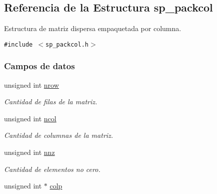 \hypertarget{structsp__packcol}{
\subsection{Referencia de la Estructura sp\_\-packcol}
\label{structsp__packcol}
}
Estructura de matriz dispersa empaquetada por columna.  


{\tt \#include $<$sp\_\-packcol.h$>$}

\subsubsection*{Campos de datos}
\begin{CompactItemize}
\item 
\hypertarget{structsp__packcol_2e12b2881843b0ff8191f0654570a748}{
unsigned int \hyperlink{structsp__packcol_2e12b2881843b0ff8191f0654570a748}{nrow}}
\label{structsp__packcol_2e12b2881843b0ff8191f0654570a748}

\begin{CompactList}\small\item\em Cantidad de filas de la matriz. \item\end{CompactList}\item 
\hypertarget{structsp__packcol_2cc24559101ca3783f1949c8eebacd7c}{
unsigned int \hyperlink{structsp__packcol_2cc24559101ca3783f1949c8eebacd7c}{ncol}}
\label{structsp__packcol_2cc24559101ca3783f1949c8eebacd7c}

\begin{CompactList}\small\item\em Cantidad de columnas de la matriz. \item\end{CompactList}\item 
\hypertarget{structsp__packcol_667202fa30dd3d49982e3b0c8148bde4}{
unsigned int \hyperlink{structsp__packcol_667202fa30dd3d49982e3b0c8148bde4}{nnz}}
\label{structsp__packcol_667202fa30dd3d49982e3b0c8148bde4}

\begin{CompactList}\small\item\em Cantidad de elementos no cero. \item\end{CompactList}\item 
\hypertarget{structsp__packcol_c9a9e31c6b9c1416fff29944568ea18f}{
unsigned int $\ast$ \hyperlink{structsp__packcol_c9a9e31c6b9c1416fff29944568ea18f}{colp}}
\label{structsp__packcol_c9a9e31c6b9c1416fff29944568ea18f}


\end{CompactItemize}
